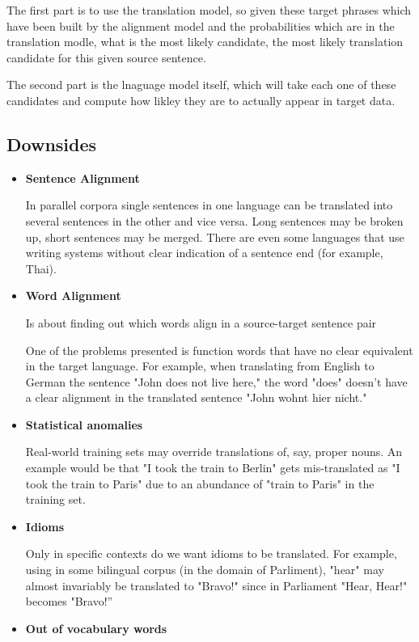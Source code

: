 \documentclass[11pt]{article}
\begin{document}
The first part is to use the translation model, so given these target phrases which have been built by the alignment model and the probabilities which are in the translation modle, what is the most likely candidate, the most likely translation candidate for this given source sentence. 

The second part is the lnaguage model itself, which will take each one of these candidates and compute how likley they are to actually appear in target data.

\subsection{Downsides}

\begin{itemize}
    \item \textbf{Sentence Alignment}
    
    In parallel corpora single sentences in one language can be translated into
    several sentences in the other and vice versa. Long sentences may be
    broken up, short sentences may be merged. There are even some
    languages that use writing systems without clear indication of a sentence
    end (for example, Thai).

    \item \textbf{Word Alignment}
    
    Is about finding out which words align in a source-target sentence pair

    One of the problems presented is function words that have no clear
    equivalent in the target language. For example, when translating from
    English to German the sentence "John does not live here," the word
    "does" doesn't have a clear alignment in the translated sentence "John
    wohnt hier nicht."

    \item \textbf{Statistical anomalies}
    
    Real-world training sets may override translations of, say, proper nouns.
    An example would be that "I took the train to Berlin" gets mis-translated as
    "I took the train to Paris" due to an abundance of "train to Paris" in the
    training set.

    \item \textbf{Idioms}
    
    Only in specific contexts do we want idioms to be translated. For example,
    using in some bilingual corpus (in the domain of Parliment), "hear" may
    almost invariably be translated to "Bravo!" since in Parliament "Hear,
    Hear!" becomes "Bravo!”

    \item \textbf{Out of vocabulary words}
\end{itemize}
\end{document}
